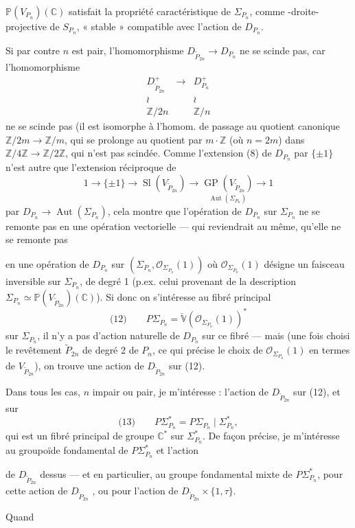 \documentclass[11pt,a4paper]{article}
\begin{document}
$\mathbb{P}(V_{P_n})(\mathbb{C})$ satisfait \struck{\ill{}} la propriété caractéristique de $\Sigma_{P_n}$, comme -droite-projective de \struck{\ill{}} $S_{P_n}$, « stable » compatible avec l'action de $D_{P_n}$.

Si par contre $n$ est pair, l'homomorphisme \struck{\ill{}} $D_{\tilde P_{2n}} \to D_{P_n}$ ne se scinde pas, car l'homomorphisme
\[
  \begin{array}{ccc}
    D_{\tilde P_{2n}}^+ & \longrightarrow & D_{P_n}^+ \\
    \wr & & \wr \\
    \mathbb{Z}/2n & & \mathbb{Z}/n
  \end{array}
\]
ne se scinde pas (il est isomorphe à l'homom. de passage au quotient canonique $\mathbb{Z}/2m \to \mathbb{Z}/m$, qui se prolonge au quotient par \struck{\ill{}} $m\cdot\mathbb{Z}$ (où $n = 2m$) dans $\mathbb{Z}/4\mathbb{Z} \to \mathbb{Z}/2\mathbb{Z}$, qui n'est pas scindée.  Comme l'extension (8) de $D_{P_n}$ par $\{\pm 1\}$ n'est autre que l'extension réciproque de
\[
  1 \to \{\pm 1\} \to \operatorname{Sl}(V_{\tilde P_{2n}}) \to \underset{\textstyle \operatorname{Aut}(\Sigma_{P_n})}{\operatorname{GP}(V_{\tilde P_{2n}})} \longrightarrow 1
\]
par $D_{P_n} \to \operatorname{Aut}(\Sigma_{P_n})$, cela montre que l'opération de $D_{P_n}$ sur $\Sigma_{P_n}$ ne se remonte pas en une opération vectorielle — \struck{\ill{}} \add{\ill{}} qui reviendrait au même, qu'elle ne se remonte pas

en une opération de $D_{P_n}$ sur $(\Sigma_{P_n}, \mathcal{O}_{\Sigma_{P_n}}(1))$ où $\mathcal{O}_{\Sigma_{P_n}}(1)$ désigne un faisceau inversible sur $\Sigma_{P_n}$, de degré 1 (p.ex. celui provenant de la description \struck{\ill{}} $\Sigma_{P_n} \simeq \mathbb{P}(V_{\tilde P_{2n}})(\mathbb{C})$). Si donc on s'intéresse au fibré principal
\[
  \text{(12)}\qquad P\Sigma_{P_n} = \check{\mathbb{V}}(\mathcal{O}_{\Sigma_{P_n}}(1))^*
\]
sur $\Sigma_{P_n}$, il n'y a pas d'action naturelle de $D_{P_n}$ sur ce fibré — mais (une fois choisi le revêtement $\tilde P_{2n}$ de degré 2 de $P_n$, ce qui précise le choix de $\mathcal{O}_{\Sigma_{P_n}}(1)$ en termes de $V_{\tilde P_{2n}}$), on trouve une action de $D_{\tilde P_{2n}}$ sur (12).

Dans tous les cas, $n$ impair ou pair, je m'intéresse : l'action de $D_{\tilde P_{2n}}$ sur (12), et sur 
\[
  \text{(13)}\qquad P\Sigma_{P_n}^* = P\Sigma_{P_n} \mid \Sigma_{P_n}^* ,
\]
qui est un fibré principal de groupe $\mathbb{C}^*$ sur $\Sigma_{P_n}^*$. De façon précise, je m'intéresse au groupoïde fondamental de $P\Sigma_{P_n}^*$ et l'action

de $D_{\tilde P_{2n}}$ dessus — et en particulier, au groupe fondamental mixte de $P\Sigma_{P_n}^*$, pour cette action de $D_{\tilde P_{2n}}$ \struck{\ill{}}, ou \ill{} pour l'action de $D_{\tilde P_{2n}} \times \{1,\tau\}$. \struck{\ill{}}

Quand
\end{document}
